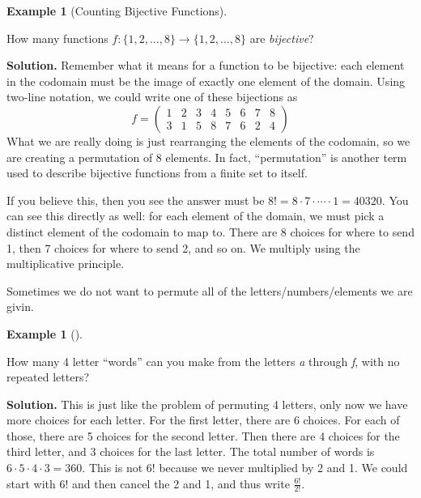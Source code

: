 \documentclass[10pt,]{book}
\theoremstyle{plain}
\theoremstyle{definition}
\newtheorem{example}[theorem]{Example}
\theoremstyle{definition}
\theoremstyle{definition}
\numberwithin{equation}{chapter}
\newcommand{\twoline}[2]{\begin{pmatrix}#1 \\ #2 \end{pmatrix}}
\newcommand{\amp}{ & }
\begin{document}
\begin{example}[Counting Bijective Functions]\label{ex_counting-functions-bijective}

          How many functions \(f:\{1,2,\ldots,8\} \to \{1,2,\ldots, 8\}\) are \emph{bijective}?
\par\medskip\noindent%
\textbf{Solution.}\quad
          Remember what it means for a function to be bijective: each element in the codomain must be the image of exactly one element of the domain. Using two-line notation, we could write one of these bijections as
          \begin{equation*}
            f = \twoline{1 \amp 2 \amp 3 \amp 4 \amp 5 \amp 6 \amp 7 \amp 8} {3 \amp 1 \amp 5 \amp 8 \amp 7 \amp 6 \amp 2 \amp 4}
          \end{equation*}
          What we are really doing is just rearranging the elements of the codomain, so we are creating a permutation of 8 elements. In fact, ``permutation'' is another term used to describe bijective functions from a finite set to itself.
\par

          If you believe this, then you see the answer must be \(8! = 8 \cdot 7 \cdot\cdots\cdot 1 = 40320\). You can see this directly as well: for each element of the domain, we must pick a distinct element of the codomain to map to. There are 8 choices for where to send 1, then 7 choices for where to send 2, and so on. We multiply using the multiplicative principle.
\end{example}
\par

        Sometimes we do not want to permute all of the letters/numbers/elements we are givin.
\begin{example}[]\label{example-33}

            How many 4 letter ``words'' can you make from the letters \emph{a} through \emph{f}, with no repeated letters?
\par\medskip\noindent%
\textbf{Solution.}\quad
            This is just like the problem of permuting 4 letters, only now we have more choices for each letter. For the first letter, there are 6 choices. For each of those, there are 5 choices for the second letter. Then there are 4 choices for the third letter, and 3 choices for the last letter. The total number of words is \(6\cdot 5\cdot 4 \cdot 3 = 360\). This is not \(6!\) because we never multiplied by 2 and 1. We could start with \(6!\) and then cancel the 2 and 1, and thus write \(\frac{6!}{2!}\).
\end{example}
\par
\end{document}

